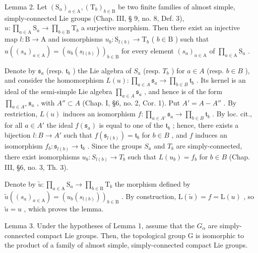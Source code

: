 Lemma 2. Let \((\mathrm{S}_a)_{a\in \mathrm{A}},(\mathrm{T}_b)_{b\in \mathrm{B}}\) be two finite families of almost simple, simply-connected Lie groups (Chap. III, § 9, no. 8, Def. 3), \(u:\prod_{a\in \mathrm{A}}\mathrm{S}_a\to \prod_{b\in \mathrm{B}}\mathrm{T}_b\) a surjective morphism. Then there exist an injective map \(l: \mathrm{B} \to \mathrm{A}\) and isomorphisms \(u_b: \mathrm{S}_{l(b)} \to \mathrm{T}_b\) ( \(b \in \mathrm{B}\) ) such that \(u((s_a)_{a \in \mathrm{A}}) = (u_b(s_{l(b)}))_{b \in \mathrm{B}}\) for every element \((s_a)_{a \in \mathrm{A}}\) of \(\prod_{a \in \mathrm{A}} \mathrm{S}_a\) .

Denote by \(\mathfrak{s}_a\) (resp. \(\mathfrak{t}_b\) ) the Lie algebra of \(S_a\) (resp. \(T_b\) ) for \(a \in A\) (resp. \(b \in B\) ), and consider the homomorphism \(L(u): \prod_{a \in A} \mathfrak{s}_a \to \prod_{b \in B} \mathfrak{t}_b\) . Its kernel is an ideal of the semi-simple Lie algebra \(\prod_{a \in A} \mathfrak{s}_a\) , and hence is of the form \(\prod_{a \in A''} \mathfrak{s}_a\) , with \(A'' \subset A\) (Chap. I, §6, no. 2, Cor. 1). Put \(A' = A - A''\) . By restriction, \(L(u)\) induces an isomorphism \(f: \prod_{a \in A'} \mathfrak{s}_a \to \prod_{b \in B} \mathfrak{t}_b\) . By loc. cit., for all \(a \in A'\) the ideal \(f(\mathfrak{s}_a)\) is equal to one of the \(\mathfrak{t}_b\) ; hence, there exists a bijection \(l: B \to A'\) such that \(f(\mathfrak{s}_{l(b)}) = \mathfrak{t}_b\) for \(b \in B\) , and \(f\) induces an isomorphism \(f_b: \mathfrak{s}_{l(b)} \to \mathfrak{t}_b\) . Since the groups \(S_a\) and \(T_b\) are simply-connected, there exist isomorphisms \(u_b: S_{l(b)} \to T_b\) such that \(L(u_b) = f_b\) for \(b \in B\) (Chap. III, §6, no. 3, Th. 3).

Denote by \(\tilde{u}:\prod_{a\in \mathrm{A}}\mathrm{S}_a\to \prod_{b\in \mathrm{B}}\mathrm{T}_b\) the morphism defined by \(\tilde{u} ((s_a)_{a\in \mathrm{A}}) = (u_b(s_{l(b)}))_{b\in \mathrm{B}}\) . By construction, \(\mathrm{L}(\tilde{u}) = f = \mathrm{L}(u)\) , so \(\tilde{u} = u\) , which proves the lemma.

Lemma 3. Under the hypotheses of Lemma 1, assume that the \(G_{\alpha}\) are simply-connected compact Lie groups. Then, the topological group G is isomorphic to the product of a family of almost simple, simply-connected compact Lie groups.

